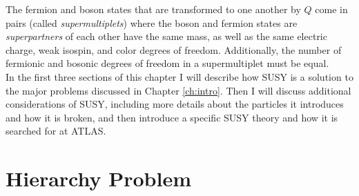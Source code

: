 The fermion and boson states that are transformed to one another by $Q$ come in pairs (called \textit{supermultiplets}) where the boson and fermion states are \textit{superpartners} of each other have the same mass, as well as the same electric charge, weak isospin, and color degrees of freedom.  Additionally, the number of fermionic and bosonic degrees of freedom in a supermultiplet must be equal. \\ %





In the first three sections of this chapter I will describe how SUSY is a solution to the major problems discussed in Chapter \ref{ch:intro}.  Then I will discuss additional considerations of SUSY, including more details about the particles it introduces and how it is broken, and then introduce a specific SUSY theory and how it is searched for at ATLAS.


\section{Hierarchy Problem}%


